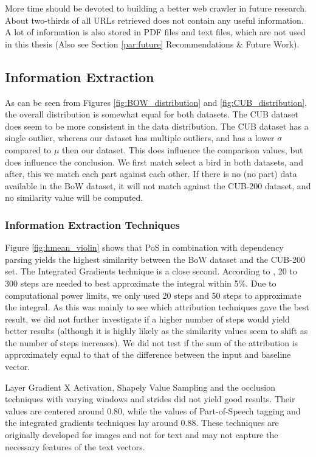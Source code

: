 \documentclass[a4paper, 12pt, oneside]{book} %
\begin{document}
More time should be devoted to building a better web crawler in future research. 
About two-thirds of all URLs retrieved does not contain any useful information.
A lot of information is also stored in PDF files and text files, which are not used in this thesis (Also see Section \ref{par:future} Recommendations \& Future Work).

\subsection{Information Extraction }
As can be seen from Figures \ref{fig:BOW_distribution} and \ref{fig:CUB_distribution}, the overall distribution is somewhat equal for both datasets.
The CUB dataset does seem to be more consistent in the data distribution.
The CUB dataset has a single outlier, whereas our dataset has multiple outliers, and has a lower $\sigma$ compared to $\mu$ then our dataset.
This does influence the comparison values, but does influence the conclusion.
We first match select a bird in both datasets, and after, this we match each part against each other.
If there is no (no part) data available in the BoW dataset, it will not match against the CUB-200 dataset, and no similarity value will be computed.

\subsubsection{Information Extraction Techniques}
Figure \ref{fig:hmean_violin} shows that PoS in combination with dependency parsing yields the highest similarity between the BoW dataset and the CUB-200 set.
The Integrated Gradients technique is a close second. 
According to \textcite{sundararajan_axiomatic_2017}, 20 to 300 steps are needed to best approximate the integral within 5\%.
Due to computational power limits, we only used 20 steps and 50 steps to approximate the integral.
As this was mainly to see which attribution techniques gave the best result, we did not further investigate if a higher number of steps would yield better results (although it is highly likely as the similarity values seem to shift as the number of steps increases).
We did not test if the sum of the attribution is approximately equal to that of the difference between the input and baseline vector.

Layer Gradient X Activation, Shapely Value Sampling and the occlusion techniques with varying windows and strides did not yield good results. 
Their values are centered around 0.80, while the values of Part-of-Speech tagging and the integrated gradients techniques lay around 0.88.
These techniques are originally developed for images and not for text and may not capture the necessary features of the text vectors.
\end{document}
